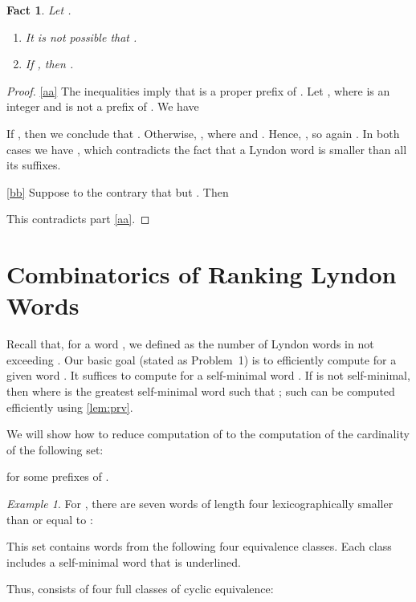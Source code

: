 \documentclass{article}
\newcommand{\mayqed}{}
\newtheorem{fact}[theorem]{Fact}
\theoremstyle{definition}
\theoremstyle{remark}
\newtheorem{example}[theorem]{Example}
\begin{document}
\begin{fact}\label{fct:lyndon}
  Let .
  \begin{enumerate}[label={(\alph*)}]
    \item\label{aa}
      It is not possible that .
    \item\label{bb}
      If , then .
  \end{enumerate}
\end{fact}
\begin{proof}
  \ref{aa} The inequalities imply that  is a proper prefix of .
  Let , where  is an integer and  is not a prefix of .
  We have
  
  If , then we conclude that .
  Otherwise, , where  and .
  Hence, , so again .
  In both cases we have , which contradicts
  the fact that a Lyndon word is smaller than all its suffixes.

  \ref{bb} Suppose to the contrary that  but .
  Then
  
  This contradicts part \ref{aa}.
\mayqed\end{proof}





\section{Combinatorics of Ranking Lyndon Words}\label{sec:comb}
Recall that, for a word , we defined  as the number of Lyndon words
in  not exceeding .
Our basic goal (stated as Problem~1) is to efficiently compute  for a given word .
It suffices to compute  for a self-minimal word .
If  is not self-minimal, then  where  is the greatest self-minimal
word such that ; such  can be computed efficiently using \cref{lem:prv}.

We will show how to reduce computation of  to the computation 
of the cardinality of the following set:

for some prefixes  of .


\begin{example}
  For ,
  there are seven words of length four lexicographically smaller than or equal to :
  
  This set contains words from the following four equivalence classes.
  Each class includes a self-minimal word that is underlined.
    
  Thus,  consists of four full classes of cyclic equivalence:
  
\end{example}
\end{document}
